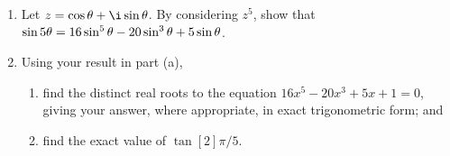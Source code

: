 \begin{problem}
    \begin{enumerate}
        \item Let $z = \cos \t + \i \sin \t$. By considering $z^5$, show that $\sin 5\theta = 16\sin^5 \theta - 20 \sin^3 \theta + 5 \sin \theta$.
        \item Using your result in part (a),
        \begin{enumerate}
            \item find the distinct real roots to the equation $16x^5 - 20x^3 +5x + 1 = 0$, giving your answer, where appropriate, in exact trigonometric form; and
            \item find the exact value of $\tan[2]{\pi/5}$.
        \end{enumerate}
    \end{enumerate}
\end{problem}
